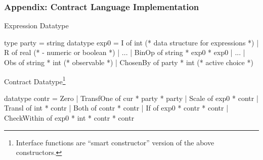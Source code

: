 \documentclass[xcolor=dvipsnames,11pt]{beamer}
\renewcommand{\emph}[1]{\textcolor{structure!90}{#1}}
\begin{document}
\begin{frame}[fragile,t]
    \frametitle{Appendix: Contract Language Implementation}
\emph{Expression Datatype}
\begin{mlcode}
type party = string                       
datatype exp0 = I of int  (* data structure for expressions *)
              | R of real (*  - numeric or boolean *)
              | ...
              | BinOp of string * exp0 * exp0
              | ...
              | Obs of string * int     (* observable *)
              | ChosenBy of party * int (* active choice *)
\end{mlcode}

\emph{Contract Datatype}\footnote{Interface functions are ``smart constructor'' version of the above
constructors.}
\begin{mlcode}
datatype contr =
       Zero
     | TransfOne of cur * party * party
     | Scale of exp0 * contr
     | Transl of int * contr
     | Both of contr * contr
     | If of exp0 * contr * contr
     | CheckWithin of exp0 * int * contr * contr
\end{mlcode}
%


\end{frame}
\end{document}
